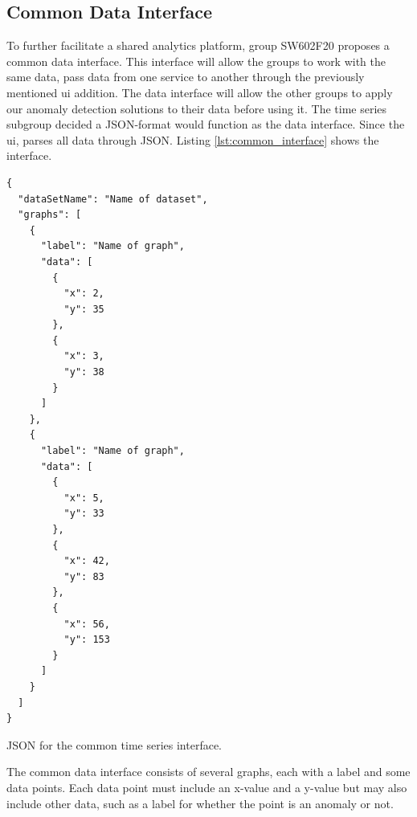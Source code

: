 \subsection{Common Data Interface}
To further facilitate a shared analytics platform, group SW602F20 proposes a common data interface. This interface will allow the groups to work with the same data,  pass data from one service to another through the previously mentioned \gls{ui} addition. The data interface will allow the other groups to apply our anomaly detection solutions to their data before using it.
The time series subgroup decided a JSON-format would function as the data interface. Since the \gls{ui}, parses all data through JSON. Listing \ref{lst:common_interface} shows the interface.

\begin{listing}[htbp]
\begin{verbatim}
{
  "dataSetName": "Name of dataset",
  "graphs": [
    {
      "label": "Name of graph",
      "data": [
        {
          "x": 2,
          "y": 35
        },
        {
          "x": 3,
          "y": 38
        }
      ]
    },
    {
      "label": "Name of graph",
      "data": [
        {
          "x": 5,
          "y": 33
        },
        {
          "x": 42,
          "y": 83
        },
        {
          "x": 56,
          "y": 153
        }
      ]
    }
  ]
}
\end{verbatim}
\caption{JSON for the common time series interface.} 
\label{lst:common_interface}
\end{listing}

The common data interface consists of several graphs, each with a label and some data points. Each data point must include an x-value and a y-value but may also include other data, such as a label for whether the point is an anomaly or not.